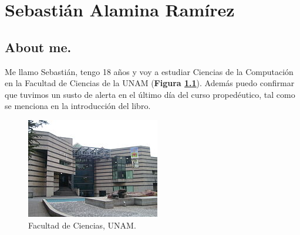 \chapter{Sebastián Alamina Ramírez}

\section{About me.}
Me llamo Sebastián, tengo 18 años y voy a estudiar Ciencias de la Computación en la Facultad de Ciencias de la UNAM (\textbf{Figura \ref{fig:26}}). Además puedo confirmar que tuvimos un susto de alerta en el último día del curso propedéutico, tal como se menciona en la introducción del libro.

\begin{figure}[h]
\centering
\includegraphics[scale=1]{IMG/26.jpg}
\caption{Facultad de Ciencias, UNAM.}
\label{fig:26}
\end{figure}
